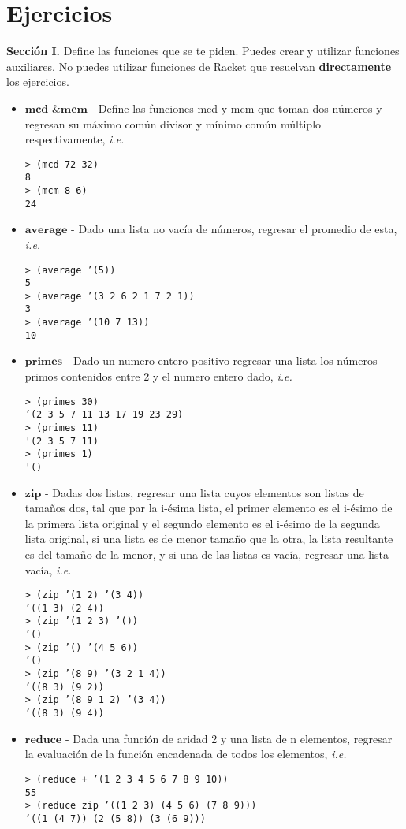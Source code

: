 \documentclass{article}
\begin{document}
\section{Ejercicios}
\textbf{Sección I.} Define las funciones que se te piden. Puedes crear y utilizar
funciones auxiliares. No puedes utilizar funciones de Racket que
resuelvan \textbf{directamente} los ejercicios.
\begin{itemize}
\item $\textbf{mcd \& mcm}$ - Define las funciones mcd y mcm que
  toman dos números y regresan su máximo común divisor y mínimo común
  múltiplo respectivamente, \textit{i.e.}
\begin{verbatim}
> (mcd 72 32)
8
> (mcm 8 6)
24
\end{verbatim}

\newpage

\item $\textbf{average}$ - Dado una lista no vacía de números, regresar el
  promedio de esta, \textit{i.e.}
\begin{verbatim}
> (average ’(5))
5
> (average ’(3 2 6 2 1 7 2 1))
3
> (average ’(10 7 13))
10
\end{verbatim}

\item $\textbf{primes}$ - Dado un numero entero positivo regresar una lista los
números primos contenidos entre 2 y el numero entero dado, \textit{i.e.}
\begin{verbatim}
> (primes 30)
’(2 3 5 7 11 13 17 19 23 29)
> (primes 11)
'(2 3 5 7 11)
> (primes 1)
'()
\end{verbatim}

\item $\textbf{zip}$ - Dadas dos listas, regresar una lista cuyos elementos son
  listas de tamaños dos, tal que par la i-ésima lista, el primer
  elemento es el i-ésimo de la primera lista original y el segundo
  elemento es el i-ésimo de la segunda lista original, si una lista es
de menor tamaño que la otra, la lista resultante es del tamaño de la
menor, y si una de las listas es vacía, regresar una lista vacía,
\textit{i.e.}
\begin{verbatim}
> (zip ’(1 2) ’(3 4))
’((1 3) (2 4))
> (zip ’(1 2 3) ’())
’()
> (zip ’() ’(4 5 6))
’()
> (zip ’(8 9) ’(3 2 1 4))
’((8 3) (9 2))
> (zip ’(8 9 1 2) ’(3 4))
’((8 3) (9 4))
\end{verbatim}

\item $\textbf{reduce}$ - Dada una función de aridad 2 y una lista de
  n elementos, regresar la evaluación de la función encadenada de
  todos los elementos, \textit{i.e.}
\begin{verbatim}
> (reduce + ’(1 2 3 4 5 6 7 8 9 10))
55
> (reduce zip ’((1 2 3) (4 5 6) (7 8 9)))
’((1 (4 7)) (2 (5 8)) (3 (6 9)))
\end{verbatim}

\end{itemize}
\end{document}

